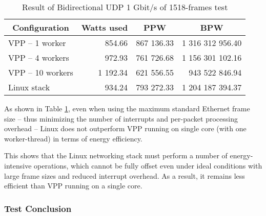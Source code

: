 \begin{table}[h!]
\centering
\begin{tabular}{|l|r|r|r|}
\hline
\multicolumn{1}{|c|}{\textbf{Configuration}} &
\multicolumn{1}{c|}{\textbf{Watts used}} &
\multicolumn{1}{c|}{\textbf{PPW}} &
\multicolumn{1}{c|}{\textbf{BPW}} \\
\hline
VPP -- 1 worker & 854.66 & 867 136.33 & 1 316 312 956.40 \\
VPP -- 4 workers & 972.93 & 761 726.68 & 1 156 301 102.16 \\
VPP -- 10 workers & 1 192.34 & 621 556.55 & 943 522 846.94 \\
Linux stack & 934.24 & 793 272.33 & 1 204 187 394.37 \\
\hline
\end{tabular}
\caption{Result of Bidirectional UDP 1 Gbit/s of 1518-frames test}
\label{tab:udp:five}
\end{table}

As shown in Table \ref{tab:udp:five}, even when using the maximum standard Ethernet frame size -- thus minimizing the number of interrupts and per-packet processing overhead -- 
Linux does not outperform VPP running on single core (with one worker-thread) in terms of energy efficiency.

This shows that the Linux networking stack must perform a number of energy-intensive operations, 
which cannot be fully offset even under ideal conditions with large frame sizes and reduced interrupt overhead. 
As a result, it remains less efficient than VPP running on a single core.

\subsubsection{Test Conclusion}





